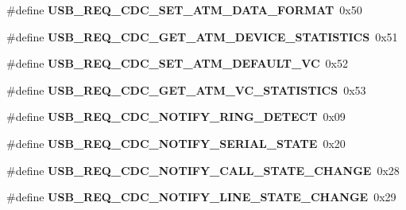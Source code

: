 \begin{DoxyCompactItemize}
\#define {\bfseries U\+S\+B\+\_\+\+R\+E\+Q\+\_\+\+C\+D\+C\+\_\+\+S\+E\+T\+\_\+\+A\+T\+M\+\_\+\+D\+A\+T\+A\+\_\+\+F\+O\+R\+M\+AT}~0x50
\item 
\mbox{\label{group__cdc__protocol__group_ga51a6c3496ca4f926d0401126e3e9aee6}} 
\#define {\bfseries U\+S\+B\+\_\+\+R\+E\+Q\+\_\+\+C\+D\+C\+\_\+\+G\+E\+T\+\_\+\+A\+T\+M\+\_\+\+D\+E\+V\+I\+C\+E\+\_\+\+S\+T\+A\+T\+I\+S\+T\+I\+CS}~0x51
\item 
\mbox{\label{group__cdc__protocol__group_gabb6d36ab906dfa74e80b42e7d87660ee}} 
\#define {\bfseries U\+S\+B\+\_\+\+R\+E\+Q\+\_\+\+C\+D\+C\+\_\+\+S\+E\+T\+\_\+\+A\+T\+M\+\_\+\+D\+E\+F\+A\+U\+L\+T\+\_\+\+VC}~0x52
\item 
\mbox{\label{group__cdc__protocol__group_ga84ff24c8cbc01c595db2ba129640befb}} 
\#define {\bfseries U\+S\+B\+\_\+\+R\+E\+Q\+\_\+\+C\+D\+C\+\_\+\+G\+E\+T\+\_\+\+A\+T\+M\+\_\+\+V\+C\+\_\+\+S\+T\+A\+T\+I\+S\+T\+I\+CS}~0x53
\item 
\mbox{\label{group__cdc__protocol__group_gab920e7b71fb8698431c35cef60126777}} 
\#define {\bfseries U\+S\+B\+\_\+\+R\+E\+Q\+\_\+\+C\+D\+C\+\_\+\+N\+O\+T\+I\+F\+Y\+\_\+\+R\+I\+N\+G\+\_\+\+D\+E\+T\+E\+CT}~0x09
\item 
\mbox{\label{group__cdc__protocol__group_ga55b0f0c908d50cb9aa8553a17f118e12}} 
\#define {\bfseries U\+S\+B\+\_\+\+R\+E\+Q\+\_\+\+C\+D\+C\+\_\+\+N\+O\+T\+I\+F\+Y\+\_\+\+S\+E\+R\+I\+A\+L\+\_\+\+S\+T\+A\+TE}~0x20
\item 
\mbox{\label{group__cdc__protocol__group_gafa88febd1fa012a2546955f369dda31a}} 
\#define {\bfseries U\+S\+B\+\_\+\+R\+E\+Q\+\_\+\+C\+D\+C\+\_\+\+N\+O\+T\+I\+F\+Y\+\_\+\+C\+A\+L\+L\+\_\+\+S\+T\+A\+T\+E\+\_\+\+C\+H\+A\+N\+GE}~0x28
\item 
\mbox{\label{group__cdc__protocol__group_ga56a8138659ffd7322ba8be458deacb85}} 
\#define {\bfseries U\+S\+B\+\_\+\+R\+E\+Q\+\_\+\+C\+D\+C\+\_\+\+N\+O\+T\+I\+F\+Y\+\_\+\+L\+I\+N\+E\+\_\+\+S\+T\+A\+T\+E\+\_\+\+C\+H\+A\+N\+GE}~0x29
\end{DoxyCompactItemize}
